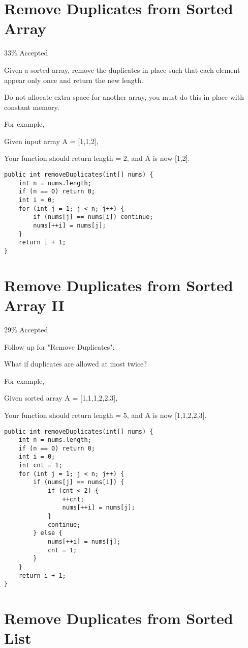 \documentclass[9pt, b5paaper]{book}
\begin{document}
\section{Remove Duplicates from Sorted Array}
\label{sec-5-54}

33\% Accepted

Given a sorted array, remove the duplicates in place such that each element appear only once and return the new length.

Do not allocate extra space for another array, you must do this in place with constant memory.

For example,

Given input array A = [1,1,2],

Your function should return length = 2, and A is now [1,2].
\begin{verbatim}
public int removeDuplicates(int[] nums) {
    int n = nums.length;
    if (n == 0) return 0;
    int i = 0;
    for (int j = 1; j < n; j++) {
        if (nums[j] == nums[i]) continue;
        nums[++i] = nums[j];
    }
    return i + 1;
}
\end{verbatim}
\section{Remove Duplicates from Sorted Array II}
\label{sec-5-55}

29\% Accepted

Follow up for "Remove Duplicates":

What if duplicates are allowed at most twice?

For example,

Given sorted array A = [1,1,1,2,2,3],

Your function should return length = 5, and A is now [1,1,2,2,3].
\begin{verbatim}
public int removeDuplicates(int[] nums) {
    int n = nums.length;
    if (n == 0) return 0;
    int i = 0;
    int cnt = 1;
    for (int j = 1; j < n; j++) {
        if (nums[j] == nums[i]) {
            if (cnt < 2) {
                ++cnt;
                nums[++i] = nums[j];
            } 
            continue;   
        } else {
            nums[++i] = nums[j];
            cnt = 1;
        }
    }
    return i + 1;
}
\end{verbatim}
\section{Remove Duplicates from Sorted List}
\label{sec-5-56}
\end{document}
